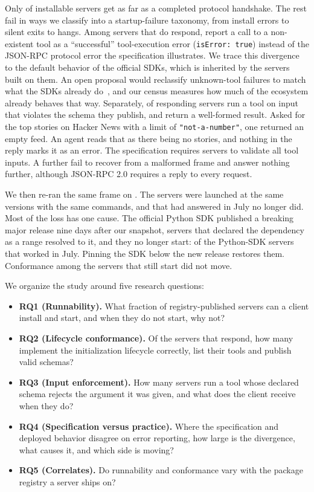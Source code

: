 Only \HandshakeRateCorr{} of installable servers get as far as a completed protocol
handshake. The rest fail in ways we classify into a startup-failure taxonomy, from
install errors to silent exits to hangs. Among servers that do respond,
\ErrAsResultRateCl{} report a call to a non-existent tool as a ``successful''
tool-execution error (\texttt{isError: true}) instead of the JSON-RPC protocol error
the specification illustrates. We trace this divergence to the default
behavior of the official SDKs, which is inherited by the servers built on
them. An open proposal would reclassify unknown-tool failures to match what the SDKs
already do~\cite{sep2145}, and our census measures how much of the ecosystem already
behaves that way. Separately, \SilentExecRateCl{} of responding servers run a tool on input that
violates the schema they publish, and return a well-formed result. Asked for the
top stories on Hacker News with a limit of \texttt{"not-a-number"}, one returned an
empty feed. An agent reads that as there being no stories, and nothing in the reply
marks it as an error. The specification requires servers to validate all tool inputs. A further \MalformedDiesRateCl{} fail to recover from a malformed frame and
answer nothing further, although JSON-RPC 2.0 requires a reply to every request.

We then re-ran the same frame on \SeptDate{}. The servers were launched at the same
versions with the same commands, and \NLost{} that had answered in July no longer did. Most of the loss has one cause. The
official Python SDK published a breaking major release nine days after our snapshot,
servers that declared the dependency as a range resolved to it, and they no longer
start: \PySDKLostCI{} of the Python-SDK servers that worked in July. Pinning the SDK
below the new release restores them. Conformance among the servers that still start
did not move.

We organize the study around five research questions:

\begin{itemize}
  \item \textbf{RQ1 (Runnability).} What fraction of registry-published servers can a
    client install and start, and when they do not start, why not?
  \item \textbf{RQ2 (Lifecycle conformance).} Of the servers that respond, how many
    implement the initialization lifecycle correctly, list their tools and publish
    valid schemas?
  \item \textbf{RQ3 (Input enforcement).} How many servers run a tool whose declared schema
    rejects the argument it was given, and what does the client receive when
    they do?
  \item \textbf{RQ4 (Specification versus practice).} Where the specification and
    deployed behavior disagree on error reporting, how large is the divergence, what
    causes it, and which side is moving?
  \item \textbf{RQ5 (Correlates).} Do runnability and conformance vary with the
    package registry a server ships on?
\end{itemize}

